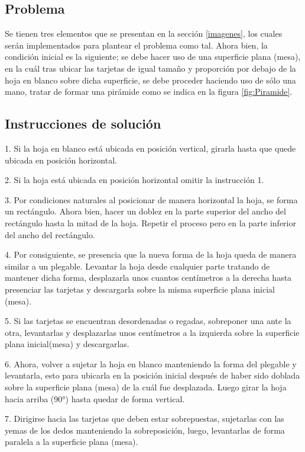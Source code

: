\documentclass{article}
\begin{document}
\subsection{Problema}
Se tienen tres elementos que se presentan en la sección \ref{imagenes}, los cuales serán implementados para plantear el problema como tal.
Ahora bien, la condición inicial es la siguiente; se debe hacer uso de una superficie plana (mesa), en la cuál tras ubicar las tarjetas de igual tamaño y proporción por debajo de la hoja en blanco sobre dicha superficie, se debe proceder haciendo uso de sólo una mano, tratar de formar una pirámide como se indica en la figura \ref{fig:Piramide}.

\subsection{Instrucciones de solución}
1. Si la hoja en blanco está ubicada en posición vertical, girarla hasta que quede ubicada en posición horizontal.

2. Si la hoja está ubicada en posición horizontal omitir la instrucción 1.

3. Por condiciones naturales al posicionar de manera horizontal la hoja, se forma un rectángulo. Ahora bien, hacer un doblez en la parte superior del ancho del rectángulo hasta la mitad de la hoja. Repetir el proceso pero en la parte inferior del ancho del rectángulo. 

4. Por consiguiente, se presencia que la nueva forma de la hoja queda de manera similar a un plegable. Levantar la hoja desde cualquier parte tratando de mantener dicha forma, desplazarla unos cuantos centímetros a la derecha hasta presenciar las tarjetas y descargarla sobre la misma superficie plana inicial (mesa).

5. Si las tarjetas se encuentran desordenadas o regadas, sobreponer una ante la otra, levantarlas y desplazarlas unos centímetros a la izquierda sobre la superficie plana inicial(mesa) y descargarlas. 

6. Ahora, volver a sujetar la hoja en blanco manteniendo la forma del plegable y levantarla, esto para ubicarla en la posición inicial después de haber sido doblada sobre la superficie plana (mesa) de la cuál fue desplazada. Luego girar la hoja hacia arriba (90°) hasta quedar de forma vertical. 

7. Dirigirse hacia las tarjetas que deben estar sobrepuestas, sujetarlas con las yemas de los dedos manteniendo la sobreposición, luego, levantarlas de forma paralela a la superficie plana (mesa).
\end{document}
